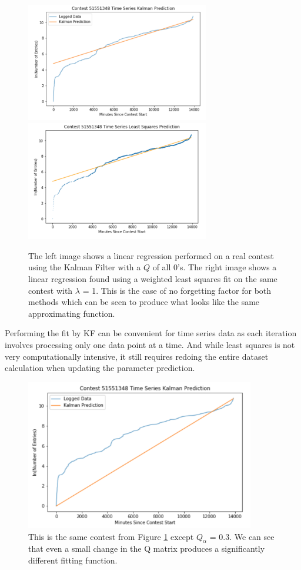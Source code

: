 \begin{figure}[h]
\centering
\includegraphics[width=8cm]{body/methodology/KF_Q0.png}
\includegraphics[width=8cm]{body/methodology/LS_pred.png}
\caption[Comparison of Least Squares and Kalman Filter Models]{The left image shows a linear regression performed on a real contest using the Kalman Filter with a $Q$ of all 0's. The right image shows a linear regression found using a weighted least squares fit on the same contest with $\lambda$ = 1. This is the case of no forgetting factor for both methods which can be seen to produce what looks like the same approximating function.}
\label{fig:kflsfit}
\end{figure}

Performing the fit by KF can be convenient for time series data as each iteration involves processing only one data point at a time. And while least squares is not very computationally intensive, it still requires redoing the entire dataset calculation when updating the parameter prediction.

\begin{figure}[h]
\centering
\includegraphics[width=10cm]{body/methodology/KF_Q3.png}
\caption[Modified Q Parameter Kalman Filter]{This is the same contest from Figure \ref{fig:kflsfit} except $Q_{\alpha}$ = 0.3. We can see that even a small change in the Q matrix produces a significantly different fitting function.}
\label{fig:q03fit}
\end{figure}

